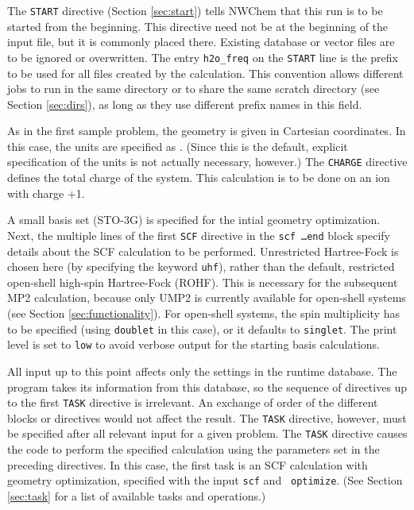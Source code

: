The \verb+START+ directive (Section \ref{sec:start}) tells NWChem that
this run is to be started from the beginning.  This directive need not
be at the beginning of the input file, but it is commonly placed there.
Existing database or vector files are to be ignored or overwritten.
The entry \verb+h2o_freq+ on the \verb+START+ line is the prefix to be used
for all files created by the calculation.  This convention allows
different jobs to run in the same directory or to share the same
scratch directory (see Section \ref{sec:dirs}), as long as they use
different prefix names in this field.

As in the first sample problem, the geometry is given in Cartesian
coordinates.  In this case, the units are specified as {\angstroms}.
(Since this is the default, explicit specification of the units is not
actually necessary, however.)  The {\tt CHARGE} directive defines the
total charge of the system.  This calculation is to be done on an ion
with charge +1.

A small basis set (STO-3G) is specified for the intial geometry
optimization.  Next, the multiple lines of the first {\tt SCF}
directive in the {\tt scf \ldots end} block specify details about the
SCF calculation to be performed.  Unrestricted Hartree-Fock is chosen
here (by specifying the keyword {\tt uhf}), rather than the default,
restricted open-shell high-spin Hartree-Fock (ROHF).  This is
necessary for the subsequent MP2 calculation, because only UMP2 is
currently available for open-shell systems (see Section
\ref{sec:functionality}).  For open-shell systems, the spin
multiplicity has to be specified (using {\tt doublet} in this case),
or it defaults to {\tt singlet}.  The print level is set to {\tt low}
to avoid verbose output for the starting basis calculations.

All input up to this point affects only the settings in the runtime
database.  The program takes its information from this database, so
the sequence of directives up to the first \verb+TASK+ directive is
irrelevant.  An exchange of order of the different blocks or
directives would not affect the result.  The {\tt TASK} directive,
however, must be specified after all relevant input for a given
problem.  The {\tt TASK} directive causes the code to perform the
specified calculation using the parameters set in the preceding
directives. In this case, the first task is an SCF calculation with
geometry optimization, specified with the input {\tt scf} and {\tt
  optimize}.  (See Section \ref{sec:task} for a list of available
tasks and operations.)

